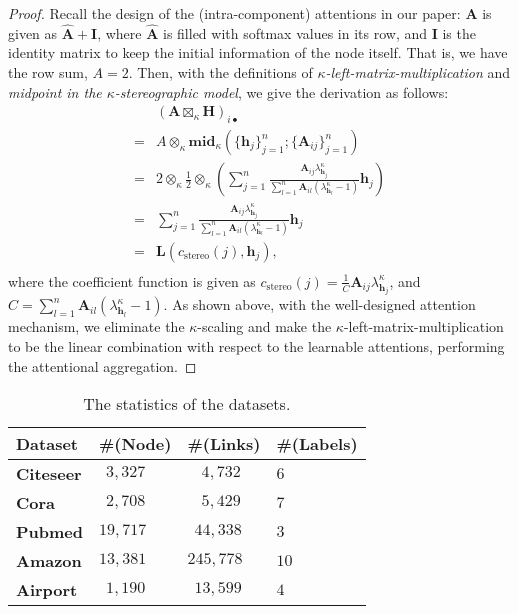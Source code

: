 \begin{proof}
Recall the design of the (intra-component) attentions in our paper:
$\mathbf A$ is given as $\hat{\mathbf A}+ \mathbf I$,
where $\hat{\mathbf A}$ is filled with softmax values in its row, and $\mathbf I$ is the identity matrix to keep the initial information of the node itself.
That is, we have the row sum, $A=2$.
Then, with the definitions of \emph{$\kappa$-left-matrix-multiplication} and \emph{midpoint in the $\kappa$-stereographic model}, we give the derivation as follows:
\begin{equation}
\begin{aligned}
   &(\mathbf{A} \boxtimes_{\kappa} \mathbf{H})_{i \bullet}\\
=&A \otimes_{\kappa} \mathbf{mid}_{\kappa}\left( \{ \mathbf{h}_j\}_{j=1}^n ; \{\mathbf A_{ij}\}_{j=1}^n\right)\\
=&2\otimes_{\kappa} \frac{1}{2} \otimes_{\kappa} \left(\sum_{j=1}^{n} \frac{\mathbf A_{ij} \lambda_{\mathbf{h}_{j}}^{\kappa}}{\sum_{l=1}^{n} \mathbf A_{il} (\lambda_{\mathbf{h}_{l}}^{\kappa}-1)} \mathbf{h}_{j}\right)\\
=&\sum_{j=1}^{n} \frac{\mathbf A_{ij} \lambda_{\mathbf{h}_{j}}^{\kappa}}{\sum_{l=1}^{n} \mathbf A_{il} (\lambda_{\mathbf{h}_{l}}^{\kappa}-1)} \mathbf{h}_{j}\\
=&\boldsymbol L(c_{\text{stereo}}(j), \mathbf{h}_{j}),\\
\end{aligned}
\end{equation}
where the coefficient function is given as $c_{\text{stereo}}(j)=\frac{1}{C}\mathbf A_{ij} \lambda_{\mathbf{h}_{j}}^{\kappa}$, and $C=\sum_{l=1}^{n} \mathbf A_{il} (\lambda_{\mathbf{h}_{l}}^{\kappa}-1)$.
As shown above, with the well-designed attention mechanism, 
we eliminate the $\kappa$-scaling and make the $\kappa$-left-matrix-multiplication to be the linear combination with respect to the learnable attentions, 
performing the attentional aggregation.
\end{proof}


 \begin{table}
    \centering
    \setcounter{table}{1}
          \caption{The statistics of  the datasets.}
    \begin{tabular}{ p{1.5cm}<{\centering} |   p{2cm}<{\centering}  p{2cm}<{\centering}   p{1.2cm}<{\centering}}
      \toprule
\textbf{Dataset}&   \#(Node)   &  \#(Links) &   \#(Labels)      \\
\toprule
\textbf{Citeseer}& $\ \ 3,327$ & $\ \ \ \ 4,732$ & $6$ \\
\textbf{Cora}      & $\ \ 2,708$ & $\ \ \ \ 5,429$ & $7$ \\
\textbf{Pubmed}& $19,717$ & $\ \ 44,338$ & $3$ \\
\textbf{Amazon}& $13,381$ & $245,778$ & $10$ \\
\textbf{Airport}  & $\ \ 1,190$ & $\ \ 13,599$ & $4$ \\
      \bottomrule
    \end{tabular} 
        \label{statistics}
  \end{table}

